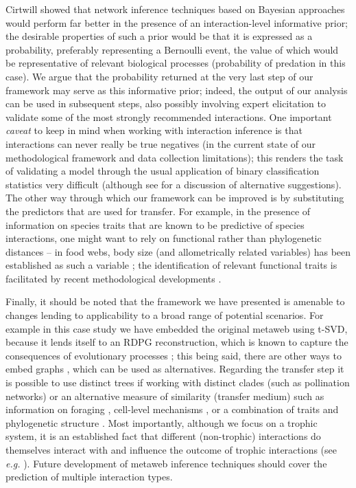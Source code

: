 Cirtwill\cite{Cirtwill2019QuaFra} showed that network inference techniques based on
Bayesian approaches would perform far better in the presence of an
interaction-level informative prior; the desirable properties of such a
prior would be that it is expressed as a probability, preferably
representing a Bernoulli event, the value of which would be
representative of relevant biological processes (probability of
predation in this case). We argue that the probability returned at the
very last step of our framework may serve as this informative prior;
indeed, the output of our analysis can be used in subsequent steps, also
possibly involving expert elicitation to validate some of the most
strongly recommended interactions. One important \emph{caveat} to keep
in mind when working with interaction inference is that interactions can
never really be true negatives (in the current state of our
methodological framework and data collection limitations); this renders
the task of validating a model through the usual application of binary
classification statistics very difficult (although see
\cite{Strydom2021RoaPre} for a discussion of alternative suggestions). The
other way through which our framework can be improved is by substituting
the predictors that are used for transfer. For example, in the presence
of information on species traits that are known to be predictive of
species interactions, one might want to rely on functional rather than
phylogenetic distances -- in food webs, body size (and allometrically
related variables) has been established as such a variable
\cite{Brose2006ConRes}; the identification of relevant functional traits
is facilitated by recent methodological developments
\cite{Rosado2013GoiBac}.

Finally, it should be noted that the framework we have presented is
amenable to changes lending to applicability to a broad range of
potential scenarios. For example in this case study we have embedded the
original metaweb using t-SVD, because it lends itself to an RDPG
reconstruction, which is known to capture the consequences of
evolutionary processes \cite{DallaRiva2016ExpEvo}; this being said,
there are other ways to embed graphs \cite{Arsov2019NetEmb,
Cai2017ComSur, Cao2019NetEmb}, which can be used as alternatives.
Regarding the transfer step it is possible to use distinct trees if
working with distinct clades (such as pollination networks) or an
alternative measure of similarity (transfer medium) such as information
on foraging \cite{Beckerman2006ForBio}, cell-level mechanisms
\cite{Boeckaerts2021PreBac}, or a combination of traits and phylogenetic
structure \cite{Stock2021PaiLea}. Most importantly, although we focus on
a trophic system, it is an established fact that different (non-trophic)
interactions do themselves interact with and influence the outcome of
trophic interactions (see \emph{e.g.} \cite{Kawatsu2021AreNet,
Kefi2012MorMea}). Future development of metaweb inference techniques
should cover the prediction of multiple interaction types.

